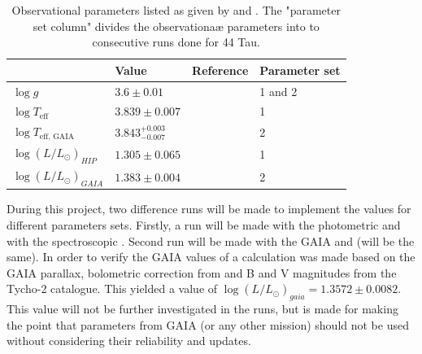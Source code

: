 \begin{table}[htbp]
	\caption{Observational parameters listed as given by \citet{lenz2010delta} and \citet{brown2018gaia}. The "parameter set column" divides the observationaæ parameters into to consecutive runs done for 44 Tau.}
	\label{obsparams}
\centering
\begin{tabular}{|l|lll|}
\hline
                                                   & Value                                             & Reference  & Parameter set\\ \hline
$\log g $                                  &  $3.6 \pm 0.01$                            & \citep{zima2007high} & 1 and 2   \\
$\log T_\text{eff}$             & $3.839  \pm 0.007$                   &   \citep{lenz2010delta}  & 1 \\
$\log T_\text{eff, GAIA}$ &  $3.843^{+0.003}_{-0.007}$ & \citep{brown2018gaia} & 2\\
$\log (L/L_\odot)_{HIP}$                  &  $1.305 \pm 0.065$                          & \citep{lenz2010delta}  & 1   \\
$\log (L/L_\odot)_{GAIA}$& $1.383 \pm 0.004$                        &  \citep{brown2018gaia}  & 2 \\ \hline
\end{tabular}
\end{table}

During this project, two difference runs will be made to implement the values for different parameters sets. Firstly, a run will be made with the \citet{lenz2010delta} photometric \teff and \lum with the spectroscopic \logg. Second run will be made with the GAIA \teff and \lum (\logg will be the same). In order to verify the GAIA values of \lum a calculation was made based on the GAIA parallax, bolometric correction from \citet{Flower96} and B and V magnitudes from the Tycho-2 catalogue. This yielded a value of $\log (L/L_\odot)_{gaia} = 1.3572 \pm 0.0082$. This value will not be further investigated in the runs, but is made for making the point that parameters from GAIA (or any other mission) should not be used without considering their reliability and updates. 



